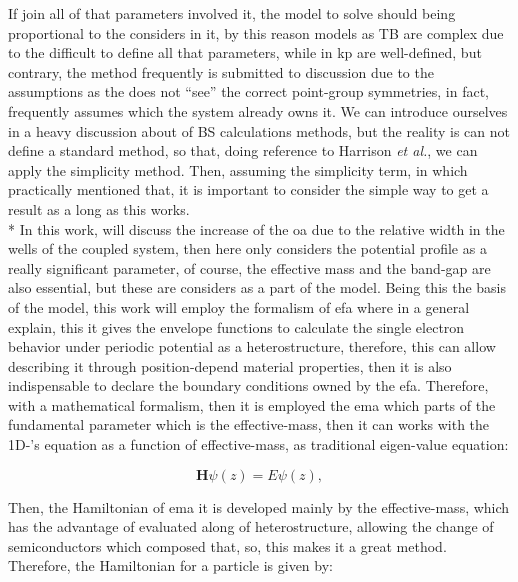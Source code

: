 If join all of that parameters involved it, the model to solve should being proportional to the considers in it, by this reason models as \gls{TB} are complex due to the difficult to define all that parameters, while in \gls{kp} are well-defined, but contrary, the method frequently is  submitted to discussion due to the assumptions as the does not ``see'' the correct point-group symmetries, in fact, frequently assumes which the system already owns it.  We can introduce ourselves in a heavy discussion about of \gls{BS} calculations methods, but the reality is can not define a standard method, so that, doing reference to Harrison \textit{et al.}\cite{harrison2016quantum}, we can apply the simplicity method.
Then, assuming the simplicity term, in which practically mentioned that, it is important to consider the simple way to get a result as a long as this works.\\*
In this work, will discuss the increase of the  \gls{oa}  due to the relative width in the wells of the coupled system, then here only considers the potential profile as a really significant parameter, of course, the effective mass and   the band-gap are also essential, but these are considers as a part of the model. Being this the basis of the model, this work will employ the formalism of \gls{efa} where in a general explain, this it  gives the envelope functions to calculate the single electron behavior under periodic potential as a heterostructure, therefore, this can allow describing it  through position-depend material properties\cite{foreman1996envelope,benduke1966spacecharge,bastard1990wave}, then it is also indispensable to declare the boundary conditions owned by the \gls{efa}. Therefore, with a mathematical formalism, then it is employed the \gls{ema} which parts of the fundamental  parameter which is the effective-mass, then it can works with the 1D-\sch's equation as a function of effective-mass, as traditional eigen-value equation:

\begin{equation}\label{eqn:chapter-2-sec-numerical-calculations-eigen-value-equation}
	\textbf{H}\psi(z)=E\psi(z),
\end{equation}

Then, the Hamiltonian of \gls{ema} it is developed mainly by the effective-mass, which has the advantage of evaluated along of heterostructure,  allowing  the change of semiconductors which composed that, so, this makes it a great method. Therefore, the Hamiltonian for a particle is given by\cite{kamizato1989excitons,bastard1990wave,foreman1996envelope}:

